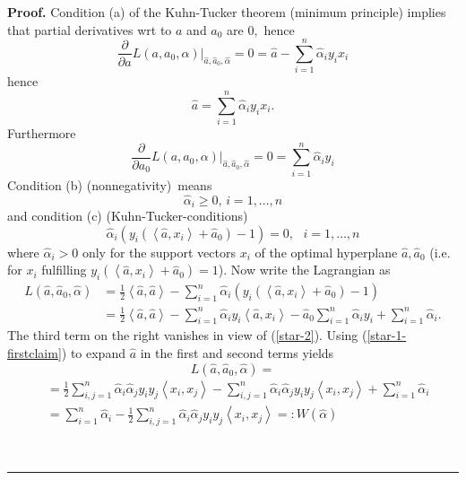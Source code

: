 \documentclass[11pt,twoside]{article}%
\theoremstyle{change}
\newenvironment{proof}[1][Proof]{\textbf{#1.} }{\ \rule{0.5em}{0.5em}}
\begin{document}
\begin{proof}
Condition (a) of the Kuhn-Tucker theorem (minimum principle) implies that
partial derivatives wrt to $a$ and $a_{0}$ are $0,$ hence%
\[
\frac{\partial}{\partial a}L\left(  a,a_{0},\alpha\right)  |_{\hat{a},\hat
{a}_{0},\hat{\alpha}}=0=\hat{a}-\sum_{i=1}^{n}\hat{\alpha}_{i}y_{i}x_{i}%
\]
hence
\begin{equation}
\hat{a}=\sum_{i=1}^{n}\hat{\alpha}_{i}y_{i}x_{i}.\label{star-1-firstclaim}%
\end{equation}
Furthermore
\begin{equation}
\frac{\partial}{\partial a_{0}}L\left(  a,a_{0},\alpha\right)  |_{\hat{a}%
,\hat{a}_{0},\hat{\alpha}}=0=\sum_{i=1}^{n}\hat{\alpha}_{i}y_{i}\label{star-2}%
\end{equation}
Condition (b) (nonnegativity)\ means
\[
\hat{\alpha}_{i}\geq0\text{, }i=1,\ldots,n
\]
and condition (c) (Kuhn-Tucker-conditions)
\[
\hat{\alpha}_{i}\left(  y_{i}\left(  \left\langle \hat{a},x_{i}\right\rangle
+\hat{a}_{0}\right)  -1\right)  =0,\text{ }i=1,\ldots,n
\]
where $\hat{\alpha}_{i}>0$ only for the support vectors $x_{i}$ of the optimal
hyperplane $\hat{a},\hat{a}_{0}$ (i.e. for $x_{i}$ fulfilling $y_{i}\left(
\left\langle \hat{a},x_{i}\right\rangle +\hat{a}_{0}\right)  =1$). Now write
the Lagrangian as
\begin{align*}
L\left(  \hat{a},\hat{a}_{0},\hat{\alpha}\right)   & =\frac{1}{2}\left\langle
\hat{a},\hat{a}\right\rangle -\sum_{i=1}^{n}\hat{\alpha}_{i}\left(
y_{i}\left(  \left\langle \hat{a},x_{i}\right\rangle +\hat{a}_{0}\right)
-1\right) \\
& =\frac{1}{2}\left\langle \hat{a},\hat{a}\right\rangle -\sum_{i=1}^{n}%
\hat{\alpha}_{i}y_{i}\left\langle \hat{a},x_{i}\right\rangle -\hat{a}_{0}%
\sum_{i=1}^{n}\hat{\alpha}_{i}y_{i}+\sum_{i=1}^{n}\hat{\alpha}_{i}.
\end{align*}
The third term on the right vanishes in view of (\ref{star-2}). Using
(\ref{star-1-firstclaim}) to expand $\hat{a}$ in the first and second terms
yields
\[
L\left(  \hat{a},\hat{a}_{0},\hat{\alpha}\right)  =
\]%
\begin{align*}
& =\frac{1}{2}\sum_{i,j=1}^{n}\hat{\alpha}_{i}\hat{\alpha}_{j}y_{i}%
y_{j}\left\langle x_{i},x_{j}\right\rangle -\sum_{i,j=1}^{n}\hat{\alpha}%
_{i}\hat{\alpha}_{j}y_{i}y_{j}\left\langle x_{i},x_{j}\right\rangle
+\sum_{i=1}^{n}\hat{\alpha}_{i}\\
& =\sum_{i=1}^{n}\hat{\alpha}_{i}-\frac{1}{2}\sum_{i,j=1}^{n}\hat{\alpha}%
_{i}\hat{\alpha}_{j}y_{i}y_{j}\left\langle x_{i},x_{j}\right\rangle
=:W(\hat{\alpha})
\end{align*}

\end{proof}
\end{document}
